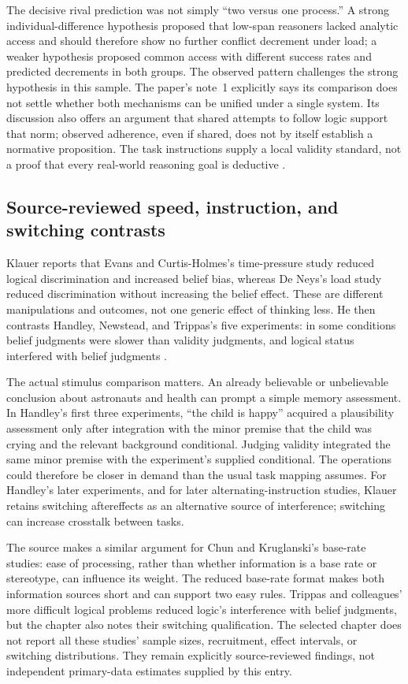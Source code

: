 The decisive rival prediction was not simply ``two versus one process.''
A strong individual-difference hypothesis proposed that low-span
reasoners lacked analytic access and should therefore show no further
conflict decrement under load; a weaker hypothesis proposed common
access with different success rates and predicted decrements in both
groups. The observed pattern challenges the strong hypothesis in this
sample. The paper's note~1 explicitly says its comparison does not
settle whether both mechanisms can be unified under a single system.
Its discussion also offers an argument that shared attempts to follow
logic support that norm; observed adherence, even if shared, does not
by itself establish a normative proposition. The task instructions
supply a local validity standard, not a proof that every real-world
reasoning goal is deductive \cite[pp.~429,432--433]{DeNeys2006DualProcessing}.

\subsection{Source-reviewed speed, instruction, and switching contrasts}

Klauer reports that Evans and Curtis-Holmes's time-pressure study
reduced logical discrimination and increased belief bias, whereas
De Neys's load study reduced discrimination without increasing the
belief effect. These are different manipulations and outcomes, not
one generic effect of thinking less. He then contrasts Handley,
Newstead, and Trippas's five experiments: in some conditions belief
judgments were slower than validity judgments, and logical status
interfered with belief judgments \cite[pp.~178--179]{Klauer2021DualProcess}.

The actual stimulus comparison matters. An already believable or
unbelievable conclusion about astronauts and health can prompt a simple
memory assessment. In Handley's first three experiments, ``the child
is happy'' acquired a plausibility assessment only after integration
with the minor premise that the child was crying and the relevant
background conditional. Judging validity integrated the same minor
premise with the experiment's supplied conditional. The operations
could therefore be closer in demand than the usual task mapping assumes.
For Handley's later experiments, and for later alternating-instruction
studies, Klauer retains switching aftereffects as an alternative source
of interference; switching can increase crosstalk between tasks.

The source makes a similar argument for Chun and Kruglanski's base-rate
studies: ease of processing, rather than whether information is a base
rate or stereotype, can influence its weight. The reduced base-rate
format makes both information sources short and can support two easy
rules. Trippas and colleagues' more difficult logical problems reduced
logic's interference with belief judgments, but the chapter also notes
their switching qualification. The selected chapter does not report
all these studies' sample sizes, recruitment, effect intervals, or
switching distributions. They remain explicitly source-reviewed findings,
not independent primary-data estimates supplied by this entry.

